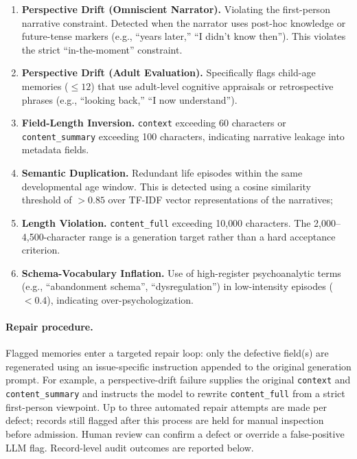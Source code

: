 \documentclass[11pt]{article}
\begin{document}
\begin{enumerate}[leftmargin=1.5em, itemsep=4pt]
  \item \textbf{Perspective Drift (Omniscient Narrator).} Violating the first-person narrative constraint. Detected when the narrator uses post-hoc knowledge or future-tense markers (e.g., ``years later,'' ``I didn't know then''). This violates the strict ``in-the-moment'' constraint.

  \item \textbf{Perspective Drift (Adult Evaluation).} Specifically flags child-age memories ($\leq 12$) that use adult-level cognitive appraisals or retrospective phrases (e.g., ``looking back,'' ``I now understand'').

  \item \textbf{Field-Length Inversion.} \texttt{context} exceeding 60 characters or \texttt{content\_summary} exceeding 100 characters, indicating narrative leakage into metadata fields.

  \item \textbf{Semantic Duplication.} Redundant life episodes within the same developmental age window. This is detected using a cosine similarity threshold of $> 0.85$ over TF-IDF vector representations of the narratives; 

  \item \textbf{Length Violation.} \texttt{content\_full} exceeding 10{,}000 characters. The 2{,}000--4{,}500-character range is a generation target rather than a hard acceptance criterion.

  \item \textbf{Schema-Vocabulary Inflation.} Use of high-register psychoanalytic terms (e.g., ``abandonment schema'', ``dysregulation'') in low-intensity episodes ($< 0.4$), indicating over-psychologization.
\end{enumerate}

\paragraph{Repair procedure.}
Flagged memories enter a targeted repair loop: only the defective field(s) are regenerated using an issue-specific instruction appended to the original generation prompt. For example, a perspective-drift failure supplies the original \texttt{context} and \texttt{content\_summary} and instructs the model to rewrite \texttt{content\_full} from a strict first-person viewpoint. Up to three automated repair attempts are made per defect; records still flagged after this process are held for manual inspection before admission. Human review can confirm a defect or override a false-positive LLM flag. Record-level audit outcomes are reported below.
\end{document}
